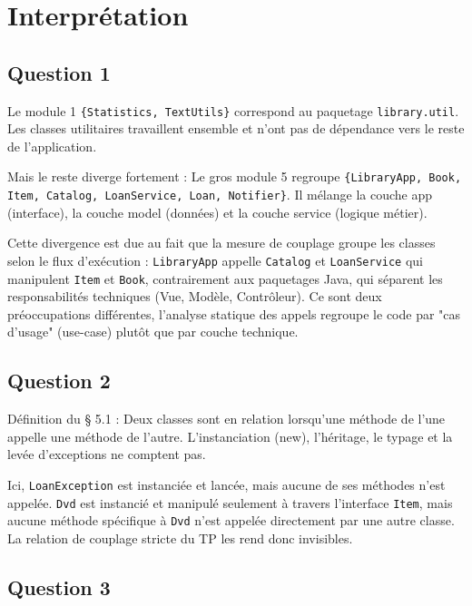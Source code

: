 \documentclass{Templates/customArticle}
\begin{document}
\newpage
\section{Interprétation}

\subsection{Question 1}

Le module 1 \texttt{\{Statistics, TextUtils\}} correspond au paquetage \texttt{library.util}. Les classes utilitaires travaillent ensemble et n'ont pas de dépendance vers le reste de l'application.

Mais le reste diverge fortement : Le gros module 5 regroupe \texttt{\{LibraryApp, Book, Item, Catalog, LoanService, Loan, Notifier\}}. Il mélange la couche app (interface), la couche model (données) et la couche service (logique métier).

Cette divergence est due au fait que la mesure de couplage groupe les classes selon le flux d'exécution : \texttt{LibraryApp} appelle \texttt{Catalog} et \texttt{LoanService} qui manipulent \texttt{Item} et \texttt{Book}, contrairement aux paquetages Java, qui séparent les responsabilités techniques (Vue, Modèle, Contrôleur). Ce sont deux préoccupations différentes, l'analyse statique des appels regroupe le code par "cas d'usage" (use-case) plutôt que par couche technique.

\subsection{Question 2}

Définition du § 5.1 : Deux classes sont en relation lorsqu'une méthode de l'une appelle une méthode de l'autre. L'instanciation (new), l'héritage, le typage et la levée d'exceptions ne comptent pas.

Ici, \texttt{LoanException} est instanciée et lancée, mais aucune de ses méthodes n'est appelée.
\texttt{Dvd} est instancié et manipulé seulement à travers l'interface \texttt{Item}, mais aucune méthode spécifique à \texttt{Dvd} n'est appelée directement par une autre classe. La relation de couplage stricte du TP les rend donc invisibles.

\subsection{Question 3}
\end{document}
